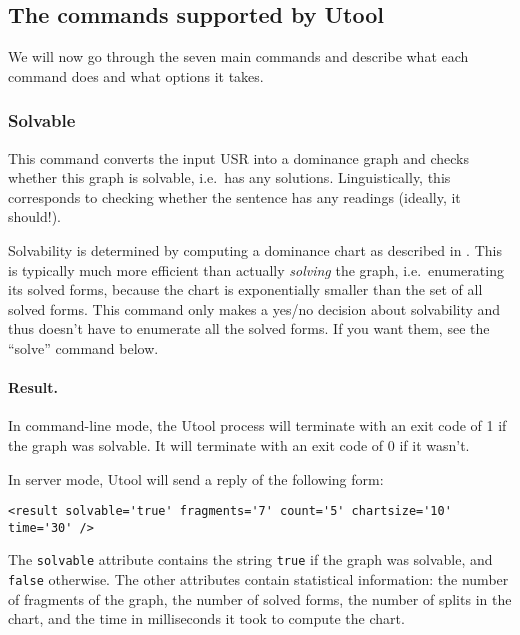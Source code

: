 \subsection{The commands supported by Utool}

We will now go through the seven main commands and describe what each
command does and what options it takes.


\subsubsection{Solvable}

This command converts the input USR into a dominance graph and checks
whether this graph is solvable, i.e.\ has any
solutions. Linguistically, this corresponds to checking whether the
sentence has any readings (ideally, it should!).

Solvability is determined by computing a dominance chart as described
in \cite{KolTha05b}. This is typically much more efficient than
actually \emph{solving} the graph, i.e.\ enumerating its solved forms,
because the chart is exponentially smaller than the set of all solved
forms. This command only makes a yes/no decision about solvability and
thus doesn't have to enumerate all the solved forms. If you want them,
see the ``solve'' command below.


\paragraph{Result.}
In command-line mode, the Utool process will terminate with an exit
code of 1 if the graph was solvable. It will terminate with an exit
code of 0 if it wasn't. 

In server mode, Utool will send a reply of the following form:
\begin{verbatim}
<result solvable='true' fragments='7' count='5' chartsize='10' time='30' />
\end{verbatim}

The \verb?solvable? attribute contains the string \verb?true? if the
graph was solvable, and \verb?false? otherwise. The other attributes
contain statistical information: the number of fragments of the graph,
the number of solved forms, the number of splits in the chart, and the
time in milliseconds it took to compute the chart.



